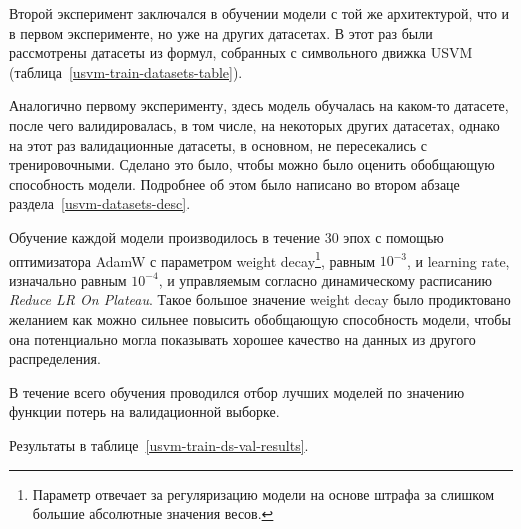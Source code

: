 Второй эксперимент заключался в обучении модели с той же архитектурой, что и в первом эксперименте, но уже на других датасетах. В этот раз были рассмотрены датасеты из формул, собранных с символьного движка USVM \cite{usvm-diploma} (таблица~\ref{usvm-train-datasets-table}).

Аналогично первому эксперименту, здесь модель обучалась на каком-то датасете, после чего валидировалась, в том числе, на некоторых других датасетах, однако на этот раз валидационные датасеты, в основном, не пересекались с тренировочными. Сделано это было, чтобы можно было оценить обобщающую способность модели. Подробнее об этом было написано во втором абзаце раздела~\ref{usvm-datasets-desc}.

Обучение каждой модели производилось в течение 30 эпох с помощью оптимизатора AdamW \cite{adamw-paper} с параметром weight decay\footnote{Параметр отвечает за регуляризацию модели на основе штрафа за слишком большие абсолютные значения весов.}, равным $10^{-3}$, и learning rate, изначально равным $10^{-4}$, и управляемым согласно динамическому расписанию \textit{Reduce LR On Plateau}. Такое большое значение weight decay было продиктовано желанием как можно сильнее повысить обобщающую способность модели, чтобы она потенциально могла показывать хорошее качество на данных из другого распределения.

В течение всего обучения проводился отбор лучших моделей по значению функции потерь на валидационной выборке.

Результаты в таблице~\ref{usvm-train-ds-val-results}.

